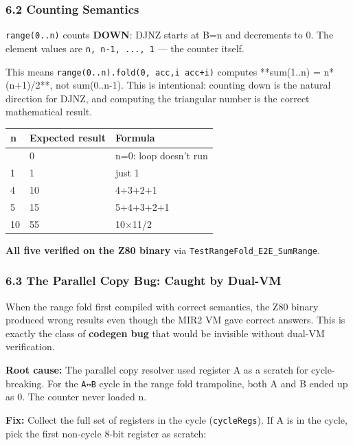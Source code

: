\documentclass[
  11pt,
]{article}
\begin{document}
\hypertarget{counting-semantics}{%
\subsubsection{6.2 Counting Semantics}\label{counting-semantics}}

\texttt{range(0..n)} counts \textbf{DOWN}: DJNZ starts at B=n and
decrements to 0. The element values are \texttt{n,\ n-1,\ ...,\ 1} ---
the counter itself.

This means
\texttt{range(0..n).fold(0,\ \textbar{}acc,i\textbar{}\ acc+i)} computes
**sum(1..n) = n*(n+1)/2**, not sum(0..n-1). This is intentional:
counting down is the natural direction for DJNZ, and computing the
triangular number is the correct mathematical result.

\begin{longtable}[]{@{}lll@{}}
\toprule\noalign{}
n & Expected result & Formula \\
\midrule\noalign{}
\endhead
\bottomrule\noalign{}
\endlastfoot
0 & 0 & n=0: loop doesn't run \\
1 & 1 & just 1 \\
4 & 10 & 4+3+2+1 \\
5 & 15 & 5+4+3+2+1 \\
10 & 55 & 10×11/2 \\
\end{longtable}

\textbf{All five verified on the Z80 binary} via
\texttt{TestRangeFold\_E2E\_SumRange}.

\hypertarget{the-parallel-copy-bug-caught-by-dual-vm}{%
\subsubsection{6.3 The Parallel Copy Bug: Caught by
Dual-VM}\label{the-parallel-copy-bug-caught-by-dual-vm}}

When the range fold first compiled with correct semantics, the Z80
binary produced wrong results even though the MIR2 VM gave correct
answers. This is exactly the class of \textbf{codegen bug} that would be
invisible without dual-VM verification.

\textbf{Root cause:} The parallel copy resolver used register A as a
scratch for cycle-breaking. For the \texttt{A↔B} cycle in the range fold
trampoline, both A and B ended up as 0. The counter never loaded n.

\textbf{Fix:} Collect the full set of registers in the cycle
(\texttt{cycleRegs}). If A is in the cycle, pick the first non-cycle
8-bit register as scratch:
\end{document}
